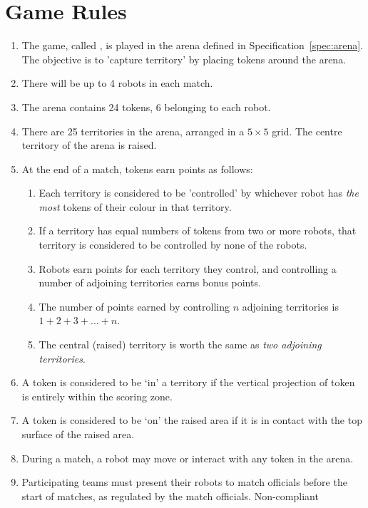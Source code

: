 \section{Game Rules}
\label{sec:rules}

\begin{enumerate}
  \item The game, called \emph{\gamename}, is played in the arena defined in
        Specification~\ref{spec:arena}. The objective is to 'capture territory' by 
        placing tokens around the arena.
  \item There will be up to 4 robots in each match.
  \item The arena contains 24 tokens, 6 belonging to each robot.
  \item There are 25 territories in the arena, arranged in a $5\times5$
        grid. The centre territory of the arena is raised.
  \item At the end of a match, tokens earn points as follows:
    \begin{enumerate}
      \item Each territory is considered to be 'controlled' by whichever robot has \emph{the most}
            tokens of their colour in that territory.
      \item If a territory has equal numbers of tokens from two or more robots, that territory
            is considered to be controlled by none of the robots.
      \item Robots earn points for each territory they control, and controlling a number of adjoining
            territories earns bonus points.
      \item The number of points earned by controlling $n$ adjoining territories is $1+2+3+...+n$.
      \item The central (raised) territory is worth the same as \emph{two adjoining territories}.
    \end{enumerate}
  \item A token is considered to be `in' a territory if the vertical projection of token
        is entirely within the scoring zone.
  \item A token is considered to be `on' the raised area if it is in contact with
        the top surface of the raised area.
  \item During a match, a robot may move or interact with any token in the arena.
  \item Participating teams must present their robots to match officials before
        the start of matches, as regulated by the match officials. Non-compliant

\end{enumerate}
